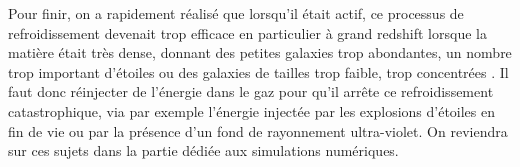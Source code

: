 Pour finir, on a rapidement réalisé que lorsqu'il était actif, ce processus de refroidissement devenait trop efficace en particulier à grand redshift lorsque la matière était très dense, donnant des petites galaxies trop abondantes, un nombre trop important d'étoiles ou des galaxies de tailles trop faible, trop concentrées . Il faut donc réinjecter de l'énergie dans le gaz pour qu'il arrête ce refroidissement catastrophique, via par exemple l'énergie injectée par les explosions d'étoiles en fin de vie ou par la présence d'un fond de rayonnement ultra-violet. On reviendra sur ces sujets dans la partie dédiée aux simulations numériques.